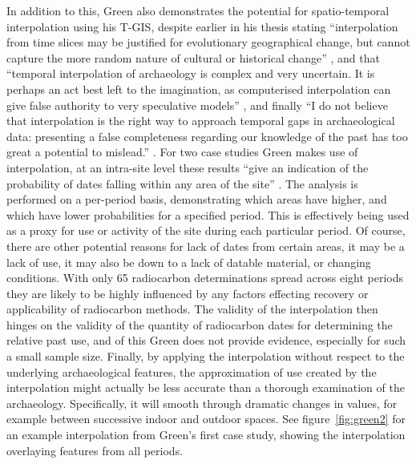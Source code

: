 In addition to this, Green also demonstrates the potential for spatio-temporal interpolation using his T-GIS, despite earlier in his thesis stating ``interpolation from time slices may be justified for evolutionary geographical change, but cannot capture the more random nature of cultural or historical change'' \citep[96]{Green:2008fk}, and that ``temporal interpolation of archaeology is complex and very uncertain. It is perhaps an act best left to the imagination, as computerised interpolation can give false authority to very speculative models'' \citep[98]{Green:2008fk}, and finally ``I do not believe that interpolation is the right way to approach temporal gaps in archaeological data: presenting a false completeness regarding our knowledge of the past has too great a potential to mislead.'' \citep[101]{Green:2008fk}. For two case studies Green makes use of interpolation, at an intra-site level these results ``give an indication of the probability of dates falling within any area of the site'' \citep[189]{Green:2008fk}. The analysis is performed on a per-period basis, demonstrating which areas have higher, and which have lower probabilities for a specified period. This is effectively being used as a proxy for use or activity of the site during each particular period. Of course, there are other potential reasons for lack of dates from certain areas, it may be a lack of use, it may also be down to a lack of datable material, or changing conditions. With only 65 radiocarbon determinations \citep[129]{Green:2008fk} spread across eight periods \citep[189]{Green:2008fk} they are likely to be highly influenced by any factors effecting recovery or applicability of radiocarbon methods. The validity of the interpolation then hinges on the validity of the quantity of radiocarbon dates for determining the relative past use, and of this Green does not provide evidence, especially for such a small sample size. Finally, by applying the interpolation without respect to the underlying archaeological features, the approximation of use created by the interpolation might actually be less accurate than a thorough examination of the archaeology. Specifically, it will smooth through dramatic changes in values, for example between successive indoor and outdoor spaces. See figure~\ref{fig:green2} for an example interpolation from Green's first case study, showing the interpolation overlaying features from all periods.

